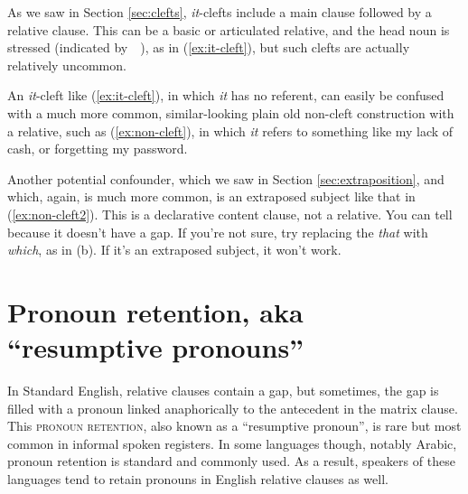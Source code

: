 As we saw in Section \ref{sec:clefts}, \textit{it}-clefts include a main clause followed by a relative clause. This can be a basic or articulated relative, and the head noun is stressed (indicated by~~), as in (\ref{ex:it-cleft}), but such clefts are actually relatively uncommon.

\ea \label{ex:it-cleft}
    \z
\z

An \textit{it}-cleft like (\ref{ex:it-cleft}), in which \textit{it} has no referent, can easily be confused with a much more common, similar-looking plain old non-cleft construction with a relative, such as (\ref{ex:non-cleft}), in which \textit{it} refers to something like my lack of cash, or forgetting my password. 

\begin{samepage}
    \ea \label{ex:non-cleft}
        \z
    \z
\end{samepage}

Another potential confounder, which we saw in Section \ref{sec:extraposition}, and which, again, is much more common, is an extraposed subject like that in (\ref{ex:non-cleft2}). This is a declarative content clause, not a relative. You can tell because it doesn't have a gap. If you're not sure, try replacing the \textit{that} with \textit{which}, as in (b). If it's an extraposed subject, it won't work.

\ea \label{ex:non-cleft2}
    \z
\z

\section{Pronoun retention, aka ``resumptive pronouns''}

In Standard English, relative clauses contain a gap, but sometimes, the gap is filled with a pronoun linked anaphorically to the antecedent in the matrix clause. This \textsc{pronoun retention}, also known as a ``resumptive pronoun'', is rare but most common in informal spoken registers. In some languages though, notably Arabic, pronoun retention is standard and commonly used. As a result, speakers of these languages tend to retain pronouns in English relative clauses as well.

